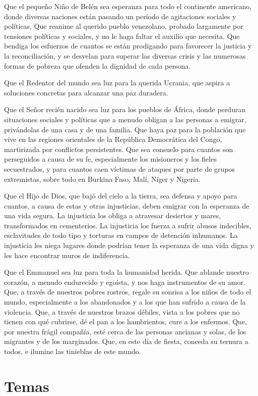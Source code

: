 \begin{body}
	Que el pequeño Niño de Belén sea esperanza para todo el continente americano, donde diversas naciones están pasando un período de agitaciones sociales y políticas. Que reanime al querido pueblo venezolano, probado largamente por tensiones políticas y sociales, y no le haga faltar el auxilio que necesita. Que bendiga los esfuerzos de cuantos se están prodigando para favorecer la justicia y la reconciliación, y se desvelan para superar las diversas crisis y las numerosas formas de pobreza que ofenden la dignidad de cada persona.
	
	Que el Redentor del mundo sea luz para la querida Ucrania, que aspira a soluciones concretas para alcanzar una paz duradera.
	
	Que el Señor recién nacido sea luz para los pueblos de África, donde perduran situaciones sociales y políticas que a menudo obligan a las personas a emigrar, privándolas de una casa y de una familia. Que haya paz para la población que vive en las regiones orientales de la República Democrática del Congo, martirizada por conflictos persistentes. Que sea consuelo para cuantos son perseguidos a causa de su fe, especialmente los misioneros y los fieles secuestrados, y para cuantos caen víctimas de ataques por parte de grupos extremistas, sobre todo en Burkina Faso, Malí, Níger y Nigeria.
	
	Que el Hijo de Dios, que bajó del cielo a la tierra, sea defensa y apoyo para cuantos, a causa de estas y otras injusticias, deben emigrar con la esperanza de una vida segura. La injusticia los obliga a atravesar desiertos y mares, transformados en cementerios. La injusticia los fuerza a sufrir abusos indecibles, esclavitudes de todo tipo y torturas en campos de detención inhumanos. La injusticia les niega lugares donde podrían tener la esperanza de una vida digna y les hace encontrar muros de indiferencia.
	
	Que el Emmanuel sea luz para toda la humanidad herida. Que ablande nuestro corazón, a menudo endurecido y egoísta, y nos haga instrumentos de su amor. Que, a través de nuestros pobres rostros, regale su sonrisa a los niños de todo el mundo, especialmente a los abandonados y a los que han sufrido a causa de la violencia. Que, a través de nuestros brazos débiles, vista a los pobres que no tienen con qué cubrirse, dé el pan a los hambrientos, cure a los enfermos. Que, por nuestra frágil compañía, esté cerca de las personas ancianas y solas, de los migrantes y de los marginados. Que, en este día de fiesta, conceda su ternura a todos, e ilumine las tinieblas de este mundo.
\end{body}

\newsection

\section{Temas}

\temasNavidad